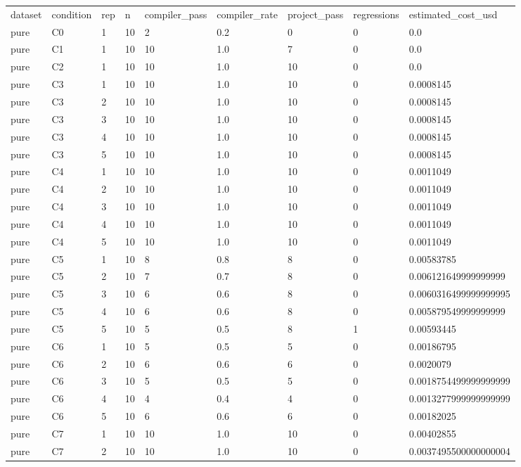 \begin{tabular}{lllllllll}
dataset & condition & rep & n & compiler\_pass & compiler\_rate & project\_pass & regressions & estimated\_cost\_usd \\
pure & C0 & 1 & 10 & 2 & 0.2 & 0 & 0 & 0.0 \\
pure & C1 & 1 & 10 & 10 & 1.0 & 7 & 0 & 0.0 \\
pure & C2 & 1 & 10 & 10 & 1.0 & 10 & 0 & 0.0 \\
pure & C3 & 1 & 10 & 10 & 1.0 & 10 & 0 & 0.0008145 \\
pure & C3 & 2 & 10 & 10 & 1.0 & 10 & 0 & 0.0008145 \\
pure & C3 & 3 & 10 & 10 & 1.0 & 10 & 0 & 0.0008145 \\
pure & C3 & 4 & 10 & 10 & 1.0 & 10 & 0 & 0.0008145 \\
pure & C3 & 5 & 10 & 10 & 1.0 & 10 & 0 & 0.0008145 \\
pure & C4 & 1 & 10 & 10 & 1.0 & 10 & 0 & 0.0011049 \\
pure & C4 & 2 & 10 & 10 & 1.0 & 10 & 0 & 0.0011049 \\
pure & C4 & 3 & 10 & 10 & 1.0 & 10 & 0 & 0.0011049 \\
pure & C4 & 4 & 10 & 10 & 1.0 & 10 & 0 & 0.0011049 \\
pure & C4 & 5 & 10 & 10 & 1.0 & 10 & 0 & 0.0011049 \\
pure & C5 & 1 & 10 & 8 & 0.8 & 8 & 0 & 0.00583785 \\
pure & C5 & 2 & 10 & 7 & 0.7 & 8 & 0 & 0.006121649999999999 \\
pure & C5 & 3 & 10 & 6 & 0.6 & 8 & 0 & 0.0060316499999999995 \\
pure & C5 & 4 & 10 & 6 & 0.6 & 8 & 0 & 0.005879549999999999 \\
pure & C5 & 5 & 10 & 5 & 0.5 & 8 & 1 & 0.00593445 \\
pure & C6 & 1 & 10 & 5 & 0.5 & 5 & 0 & 0.00186795 \\
pure & C6 & 2 & 10 & 6 & 0.6 & 6 & 0 & 0.0020079 \\
pure & C6 & 3 & 10 & 5 & 0.5 & 5 & 0 & 0.0018754499999999999 \\
pure & C6 & 4 & 10 & 4 & 0.4 & 4 & 0 & 0.0013277999999999999 \\
pure & C6 & 5 & 10 & 6 & 0.6 & 6 & 0 & 0.00182025 \\
pure & C7 & 1 & 10 & 10 & 1.0 & 10 & 0 & 0.00402855 \\
pure & C7 & 2 & 10 & 10 & 1.0 & 10 & 0 & 0.0037495500000000004 \\

\end{tabular}
